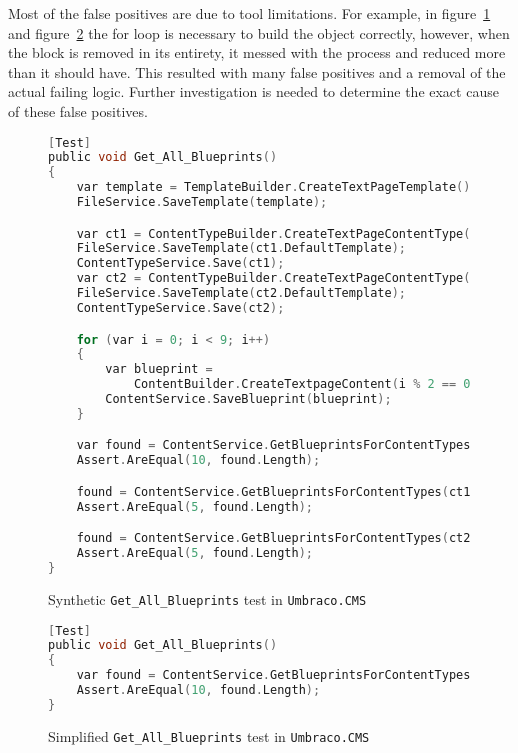 Most of the false positives are due to tool limitations. For example, in figure~\ref{fig:getAllBlueprintsOriginal} and figure~\ref{fig:getAllBlueprintsSimplified} the for loop is necessary to build the object correctly, however, when the block is removed in its entirety, it messed with the process and reduced more than it should have. This resulted with many false positives and a removal of the actual failing logic. Further investigation is needed to determine the exact cause of these false positives.

\begin{figure}
\begin{lstlisting}[language=C, linewidth=\linewidth]
[Test]
public void Get_All_Blueprints()
{
	var template = TemplateBuilder.CreateTextPageTemplate();
	FileService.SaveTemplate(template);

	var ct1 = ContentTypeBuilder.CreateTextPageContentType("ct1", defaultTemplateId: template.Id);
	FileService.SaveTemplate(ct1.DefaultTemplate);
	ContentTypeService.Save(ct1);
	var ct2 = ContentTypeBuilder.CreateTextPageContentType("ct2", defaultTemplateId: template.Id);
	FileService.SaveTemplate(ct2.DefaultTemplate);
	ContentTypeService.Save(ct2);

	for (var i = 0; i < 9; i++)
	{
		var blueprint =
			ContentBuilder.CreateTextpageContent(i % 2 == 0 ? ct1 : ct2, "hello" + i, Constants.System.Root);
		ContentService.SaveBlueprint(blueprint);
	}

	var found = ContentService.GetBlueprintsForContentTypes().ToArray();
	Assert.AreEqual(10, found.Length);

	found = ContentService.GetBlueprintsForContentTypes(ct1.Id).ToArray();
	Assert.AreEqual(5, found.Length);

	found = ContentService.GetBlueprintsForContentTypes(ct2.Id).ToArray();
	Assert.AreEqual(5, found.Length);
}

\end{lstlisting}

\caption{Synthetic \texttt{Get\_All\_Blueprints} test in \texttt{Umbraco.CMS}}
\label{fig:getAllBlueprintsOriginal}
\end{figure}

\begin{figure}
\begin{lstlisting}[language=C, linewidth=\linewidth]
[Test]
public void Get_All_Blueprints()
{
	var found = ContentService.GetBlueprintsForContentTypes().ToArray();
	Assert.AreEqual(10, found.Length);
}
\end{lstlisting}

\caption{Simplified \texttt{Get\_All\_Blueprints} test in \texttt{Umbraco.CMS}}
\label{fig:getAllBlueprintsSimplified}
\end{figure}

